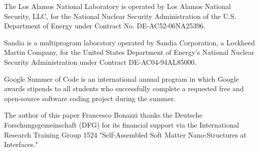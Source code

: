 The Los Alamos National Laboratory is operated by Los Alamos National Security,
LLC, for the National Nuclear Security Administration of the U.S. Department of
Energy under Contract No. DE-AC52-06NA25396.

Sandia is a multiprogram laboratory operated by Sandia Corporation, a Lockheed Martin Company, for the United States Department of Energy's National Nuclear Security Administration under Contract DE-AC04-94AL85000.

Google Summer of Code is an international annual program in which Google awards stipends to all students who successfully complete a requested free and open-source software coding project during the summer.

The author of this paper Francesco Bonazzi thanks the Deutsche
Forschungsgemeinschaft (DFG) for its financial support via the International
Research Training Group 1524 "Self-Assembled Soft Matter Nano-Structures at
Interfaces."

